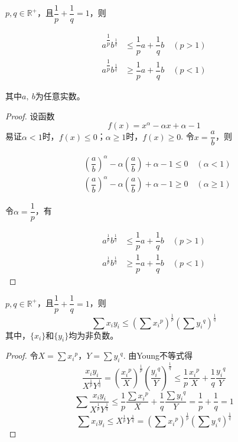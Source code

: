 \begin{theorem}[Young不等式]

    $p,q\in\mathbb{R}^+$，且$\dfrac{1}{p}+\dfrac{1}{q}=1$，则

    \begin{align*}
        a^{\dfrac{1}{p}} b^{\frac{1}{q}} & \leq \dfrac{1}{p}a + \dfrac{1}{q}b \quad (p > 1)\\
        a^{\dfrac{1}{p}} b^{\frac{1}{q}} & \geq \dfrac{1}{p}a + \dfrac{1}{q}b \quad (p < 1)
    \end{align*}

    其中$a,\ b$为任意实数。

\end{theorem}

\begin{proof}

    设函数
    $$f(x) = x^{\alpha} - \alpha x + \alpha - 1$$
    易证$\alpha < 1 $时，$f(x) \leq 0$；$\alpha \geq 1$时，$f(x) \geq 0$.
    令$x=\dfrac{a}{b}$，则
    
    \begin{align*}
        &\left( \dfrac{a}{b} \right)^{\alpha} - \alpha \left( \dfrac{a}{b} \right) + \alpha - 1 \leq 0 \quad (\alpha < 1)\\
        &\left( \dfrac{a}{b} \right)^{\alpha} - \alpha \left( \dfrac{a}{b} \right) + \alpha - 1 \geq 0 \quad (\alpha \geq 1)
    \end{align*}

    令$\alpha = \dfrac{1}{p}$，有

    \begin{align*}
        a^{\frac{1}{p}}b^{\frac{1}{q}}&\leq\dfrac{1}{p}a+\dfrac{1}{q}b\quad(p>1)\\
        a^{\frac{1}{p}}b^{\frac{1}{q}}&\geq\dfrac{1}{p}a+\dfrac{1}{q}b\quad(p<1)
    \end{align*}

\end{proof}

\begin{theorem}[H{\H o}lder不等式]
    
    $p,q\in\mathbb{R}^+$，且$\dfrac{1}{p}+\dfrac{1}{q}=1$，则
    $$\sum{x_i y_i} \leq \left(\sum{{x_i}^{p}}\right)^{\frac{1}{p}} \left(\sum{{y_i}^{q}}\right)^{\frac{1}{q}}$$
    其中，$\{x_i\}$和$\{y_i\}$均为非负数。

\end{theorem}

\begin{proof}

    令$X=\sum{{x_i}^p}$，$Y=\sum{{y_i}^q}$.
    由\textup{Young}不等式得
    $$\dfrac{x_i y_i}{X^{\frac{1}{p}}Y^{\frac{1}{q}}}=\left(\dfrac{{x_i}^p}{X}\right)^{\frac{1}{p}}\left(\dfrac{{y_i}^q}{Y}\right)^{\frac{1}{q}}\leq \dfrac{1}{p}\dfrac{{x_i}^p}{X} + \dfrac{1}{q}\dfrac{{y_i}^q}{Y}$$
    $$\sum{\dfrac{x_i y_i}{X^{\frac{1}{p}}Y^{\frac{1}{q}}}} \leq \dfrac{1}{p}\dfrac{\sum{{x_i}^p}}{X} + \dfrac{1}{q}\dfrac{\sum{{y_i}^q}}{Y} = \dfrac{1}{p}+\dfrac{1}{q}=1 $$
    $$\sum{x_i y_i} \leq X^{\frac{1}{p}} Y^{\frac{1}{q}} = (\sum{{x_i}^{p}})^{\frac{1}{p}} (\sum{{y_i}^{q}})^{\frac{1}{q}}$$

\end{proof}


